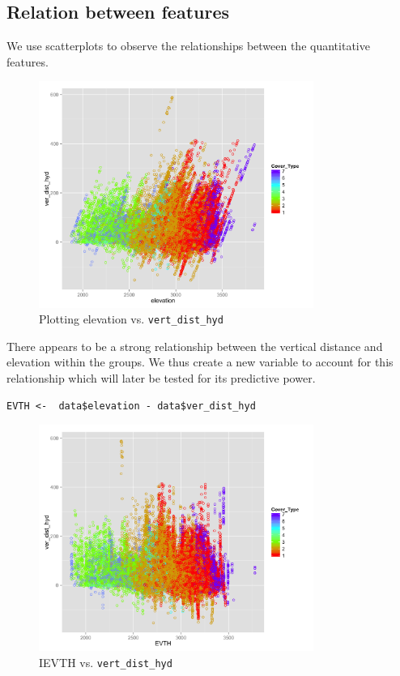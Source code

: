 \documentclass[paper=a4, fontsize=11pt]{scrartcl}
\numberwithin{equation}{section}
\numberwithin{figure}{section}
\numberwithin{table}{section}
\begin{document}
\subsection{Relation between features}
We use scatterplots to observe the relationships between the quantitative features.\\

\begin{figure}[H]
    \centering
    \includegraphics[width=0.8\textwidth]{elevation-ver_dist.png}
    \caption{Plotting elevation vs. \lstinline{vert_dist_hyd}}
    \label{fig:errors}
\end{figure}

There appears to be a strong relationship between the vertical distance and elevation within the groups. We thus create a new variable to account for this relationship which will later be tested for its predictive power. \\

\begin{lstlisting}
EVTH <-  data$elevation - data$ver_dist_hyd
\end{lstlisting}


\begin{figure}[H]
    \centering
    \includegraphics[width=0.8\textwidth]{EVTH-ver_dist.png}
    \caption{IEVTH vs. \lstinline{vert_dist_hyd}}
    \label{fig:errors}
\end{figure}
\end{document}
